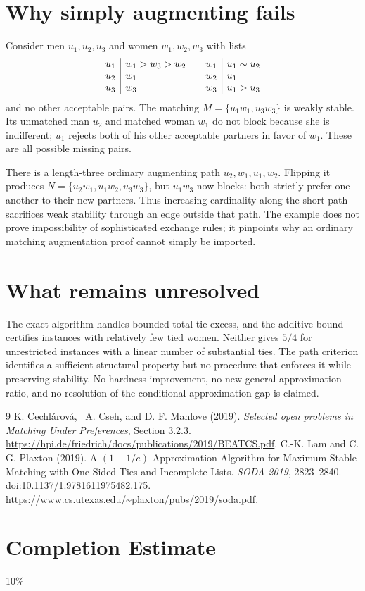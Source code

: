 \documentclass[11pt,a4paper]{article}
\theoremstyle{definition}
\theoremstyle{remark}
\begin{document}
\section{Why simply augmenting fails}
Consider men $u_1,u_2,u_3$ and women $w_1,w_2,w_3$ with lists
\[
\begin{array}{c|l@{\qquad}c|l}
 u_1&w_1>w_3>w_2&w_1&u_1\sim u_2\\
 u_2&w_1&w_2&u_1\\
 u_3&w_3&w_3&u_1>u_3
\end{array}
\]
and no other acceptable pairs. The matching
$M=\{u_1w_1,u_3w_3\}$ is weakly stable. Its unmatched man $u_2$ and matched woman $w_1$ do not block because she is indifferent; $u_1$ rejects both of his other acceptable partners in favor of $w_1$. These are all possible missing pairs.

There is a length-three ordinary augmenting path
$u_2,w_1,u_1,w_2$. Flipping it produces
$N=\{u_2w_1,u_1w_2,u_3w_3\}$, but $u_1w_3$ now blocks: both strictly prefer one another to their new partners. Thus increasing cardinality along the short path sacrifices weak stability through an edge outside that path. The example does not prove impossibility of sophisticated exchange rules; it pinpoints why an ordinary matching augmentation proof cannot simply be imported.

\section{What remains unresolved}
The exact algorithm handles bounded total tie excess, and the additive bound certifies instances with relatively few tied women. Neither gives $5/4$ for unrestricted instances with a linear number of substantial ties. The path criterion identifies a sufficient structural property but no procedure that enforces it while preserving stability. No hardness improvement, no new general approximation ratio, and no resolution of the conditional approximation gap is claimed.
\begin{thebibliography}{9}
 K. Cechl\'arov\'a, \ A. Cseh, and D. F. Manlove (2019).
\emph{Selected open problems in Matching Under Preferences}, Section 3.2.3.
\url{https://hpi.de/friedrich/docs/publications/2019/BEATCS.pdf}.
 C.-K. Lam and C. G. Plaxton (2019).
A $(1+1/e)$-Approximation Algorithm for Maximum Stable Matching with One-Sided Ties and Incomplete Lists.
\emph{SODA 2019}, 2823--2840.
\href{https://doi.org/10.1137/1.9781611975482.175}{doi:10.1137/1.9781611975482.175}.
\url{https://www.cs.utexas.edu/~plaxton/pubs/2019/soda.pdf}.
\end{thebibliography}

\section{Completion Estimate}
10\%
\end{document}
